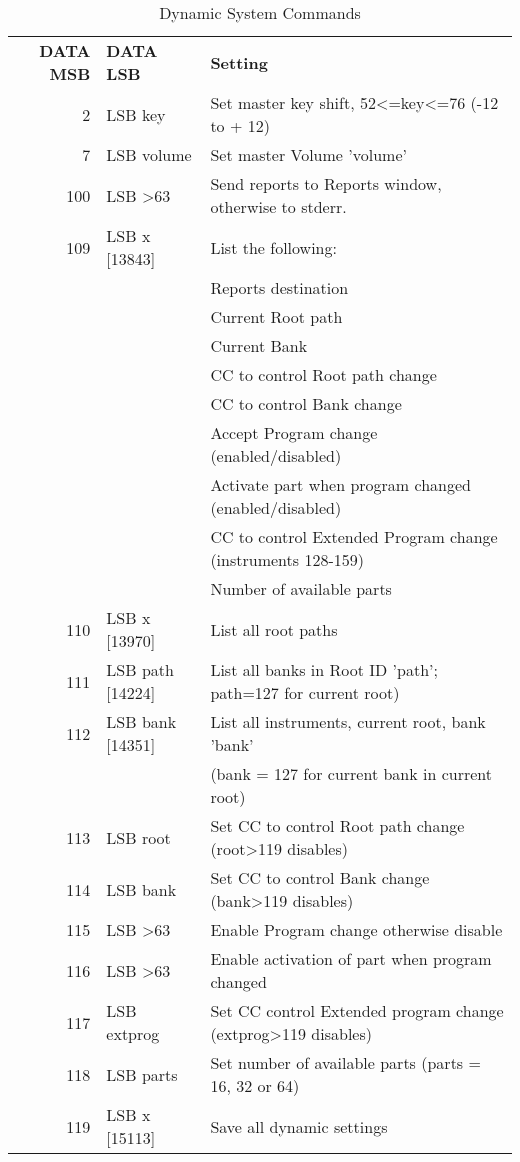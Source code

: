    \begin{table}[H]
      \centering
      \caption{Dynamic System Commands}
      \label{table:dynamic_system_commands}
      \begin{tabular}{r l l}

\textbf{DATA MSB} & \textbf{DATA LSB} & \textbf{Setting} \\

  2 & LSB key       & Set master key shift, 52\textless=key\textless=76 (-12 to + 12) \\
  7 & LSB volume    & Set master Volume 'volume' \\
100 & LSB \textgreater 63 & Send reports to Reports window, otherwise to stderr. \\
109 & LSB x [13843] & List the following: \\
    & &             Reports destination \\
    & &             Current Root path \\
    & &             Current Bank \\
    & &             CC to control Root path change \\
    & &             CC to control Bank change \\
    & &             Accept Program change (enabled/disabled) \\
    & &             Activate part when program changed (enabled/disabled) \\
    & &             CC to control Extended Program change (instruments 128-159) \\
    & &             Number of available parts \\
110 & LSB x [13970]      & List all root paths \\
111 & LSB path [14224]   & List all banks in Root ID 'path';
                           path=127 for current root) \\
112 & LSB bank [14351]   & List all instruments, current root, bank 'bank' \\
    & &                       (bank = 127 for current bank in current root) \\
113 & LSB root      & Set CC to control Root path change (root\textgreater 119 disables) \\
114 & LSB bank      & Set CC to control Bank change (bank\textgreater 119 disables) \\
115 & LSB \textgreater 63      & Enable Program change otherwise disable \\
116 & LSB \textgreater 63      & Enable activation of part when program changed \\
117 & LSB extprog   & Set CC control Extended program change
                        (extprog\textgreater 119 disables) \\
118 & LSB parts     & Set number of available parts (parts = 16, 32 or 64) \\
119 & LSB x  [15113]  &  Save all dynamic settings \\

      \end{tabular}
   \end{table}

